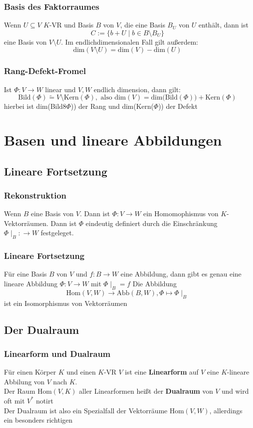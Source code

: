 \documentclass{kit}
\begin{document}
    \subsubsection{Basis des Faktorraumes}
      Wenn $U\subseteq V$ $K$-VR und Basis $B$ von $V$, die eine Basis $B_U$ von $U$ enthält, dann ist
      $$C:=\{b+U\mid b\in B\setminus B_U\}$$
      eine Basis von $V\setminus U$. Im endlichdimensionalen Fall gilt außerdem:
      $$\text{dim}(V\setminus U)=\text{dim}(V)-\text{dim}(U)$$
    \subsubsection{Rang-Defekt-Fromel}
      Ist $\Phi:V\longrightarrow W$ linear und $V,W$ endlich dimension, dann gilt:
      $$\text{Bild}(\Phi)\tilde=V\setminus\text{Kern}(\Phi),\text{ also dim}(V)=\text{dim(Bild}(\Phi))+\text{Kern}(\Phi)$$
      hierbei ist dim(Bild8$\Phi$)) der Rang und dim(Kern($\Phi$)) der Defekt
\section{Basen und lineare Abbildungen}
  \subsection{Lineare Fortsetzung}
    \subsubsection{Rekonstruktion}
      Wenn $B$ eine Basis von $V$. Dann ist $\Phi:V\longrightarrow W$ ein Homomophismus von $K$-Vektorräumen. Dann ist $\Phi$ eindeutig definiert durch die Einschränkung $\Phi\mid_B:\longrightarrow W$ festgeleget.
    \subsubsection{Lineare Fortsetzung}
      Für eine Basis $B$ von $V$ und $f:B\longrightarrow W$ eine Abbildung, dann gibt es genau eine lineare Abbildung $\Phi: V\longrightarrow W$ mit $\Phi\mid_B=f$
      Die Abbildung
      $$\text{Hom}(V,W)\longrightarrow\text{Abb}(B,W),\Phi\mapsto\Phi\mid_B$$
      ist ein Isomorphismus von Vektorräumen
    \subsection{Der Dualraum}
      \subsubsection{Linearform und Dualraum}
        Für einen Körper $K$ und einen $K$-VR $V$ ist eine \textbf{Linearform} auf $V$ eine $K$-lineare Abbilung von $V$ nach $K$.\\
        Der Raum Hom$(V,K)$ aller Linearformen heißt der \textbf{Dualraum} von $V$ und wird oft mit $V^*$ notirt\\
        Der Dualraum ist also ein Spezialfall der Vektorräume Hom$(V,W)$, allerdings ein besonders richtigen
\end{document}
